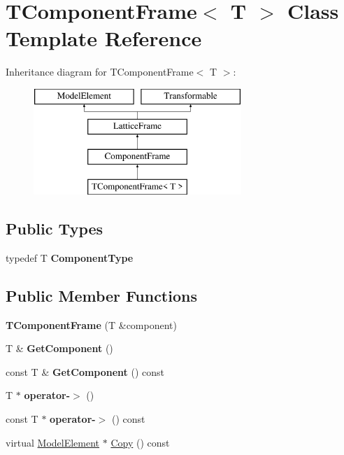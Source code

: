 \hypertarget{classTComponentFrame}{}\section{T\+Component\+Frame$<$ T $>$ Class Template Reference}
\label{classTComponentFrame}
Inheritance diagram for T\+Component\+Frame$<$ T $>$\+:\begin{figure}[H]
\begin{center}
\leavevmode
\includegraphics[height=4.000000cm]{classTComponentFrame}
\end{center}
\end{figure}
\subsection*{Public Types}
\begin{DoxyCompactItemize}
\item 
\mbox{\label{classTComponentFrame_a7ab525cfe4822d7dd543b28d08e5a40d}} 
typedef T {\bfseries Component\+Type}
\end{DoxyCompactItemize}
\subsection*{Public Member Functions}
\begin{DoxyCompactItemize}
\item 
\mbox{\label{classTComponentFrame_a3f45557e84a6ab91b67ee3ed7dc8abdb}} 
{\bfseries T\+Component\+Frame} (T \&component)
\item 
\mbox{\label{classTComponentFrame_a73481aa62f7d2c7a7f1e12fe15d1ef4c}} 
T \& {\bfseries Get\+Component} ()
\item 
\mbox{\label{classTComponentFrame_ad3ace86b56359f1dff58a998641868c2}} 
const T \& {\bfseries Get\+Component} () const
\item 
\mbox{\label{classTComponentFrame_a39622c0d07383cbc41e4bce68bd0ffd2}} 
T $\ast$ {\bfseries operator-\/$>$} ()
\item 
\mbox{\label{classTComponentFrame_a92f9d02e662a2ce4707d312142f0f48e}} 
const T $\ast$ {\bfseries operator-\/$>$} () const
\item 
virtual \hyperlink{classModelElement}{Model\+Element} $\ast$ \hyperlink{classTComponentFrame_a83b3faa024200e7d628451e1f8b50900}{Copy} () const
\end{DoxyCompactItemize}

